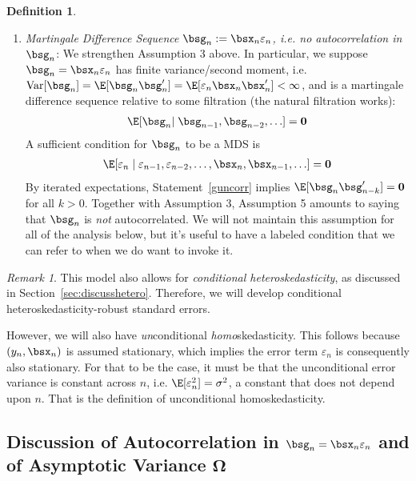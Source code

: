 \documentclass[12pt]{article}
\theoremstyle{plain}
\theoremstyle{definition}
\newtheorem{defn}[thm]{Definition}
\theoremstyle{remark}
\newtheorem*{rmk}{Remark}
\newcommand{\bsOmega}{\boldsymbol{\Omega}}
\renewcommand{\bso}{\boldsymbol{0}}
\newcommand{\Var}{\operatorname{Var}}
\begin{document}
\begin{defn}
\begin{enumerate}
  \item \emph{Martingale Difference Sequence
    $\bsg_n:=\bsx_n\varepsilon_n$, i.e. no autocorrelation in $\bsg_n$}:
    We strengthen Assumption 3 above. In particular,
    we suppose $\bsg_n=\bsx_n\varepsilon_n$ has finite variance/second
    moment, i.e.\
    $\Var[\bsg_n]=\E[\bsg_n\bsg_n']=\E[\varepsilon_n\bsx_n\bsx_n']<\infty$, and is a
    martingale difference sequence relative to some filtration
    (the natural filtration works):
    \begin{align}
      \E[\bsg_n|\;
      \bsg_{n-1},\bsg_{n-2},\ldots]
      = \bso
      \label{guncorr}
    \end{align}
    A sufficient condition for $\bsg_n$ to be a MDS is
    \begin{align*}
      \E[\varepsilon_n\;|\;
      \varepsilon_{n-1},
      \varepsilon_{n-2}, \ldots,
      \bsx_n,
      \bsx_{n-1}, \ldots]
      = \bso
    \end{align*}
    By iterated expectations,
    Statement~\ref{guncorr} implies $\E[\bsg_n\bsg_{n-k}']=\bso$ for all
    $k>0$. Together with Assumption 3, Assumption 5 amounts to saying
    that $\bsg_n$ is \emph{not} autocorrelated.
    We will not maintain this assumption for all of the analysis below,
    but it's useful to have a labeled condition that we can refer to
    when we do want to invoke it.
\end{enumerate}
\end{defn}

\begin{rmk}
This model also allows for \emph{conditional heteroskedasticity}, as
discussed in Section~\ref{sec:discusshetero}. Therefore, we will
develop conditional heteroskedasticity-robust standard errors.

However, we will also have \emph{un}conditional \emph{homo}skedasticity.
This follows because $(y_n,\bsx_n)$ is assumed stationary, which implies
the error term $\varepsilon_n$ is consequently also stationary.
For that to be the case, it must be that the unconditional error
variance is constant across $n$, i.e. $\E[\varepsilon^2_n]=\sigma^2$, a
constant that does not depend upon $n$. That is the definition of
unconditional homoskedasticity.
\end{rmk}


\clearpage
\subsection{%
  Discussion of Autocorrelation in $\bsg_n=\bsx_n\varepsilon_n$ and
  of Asymptotic Variance $\bsOmega$
}
\end{document}
